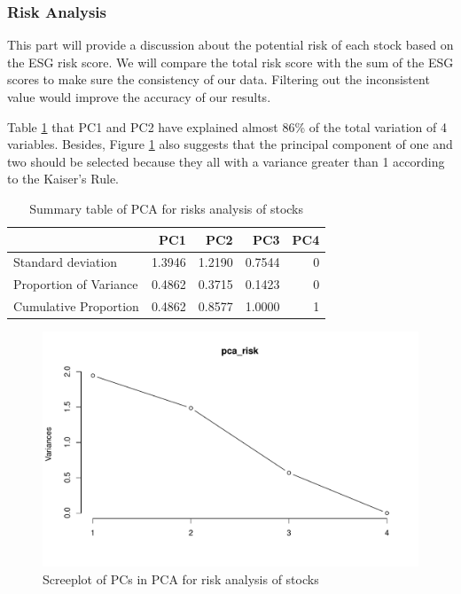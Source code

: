 \documentclass[11pt,a4paper,]{article}
\begin{document}
\hypertarget{risk-analysis}{%
\subsubsection{Risk Analysis}\label{risk-analysis}}

This part will provide a discussion about the potential risk of each stock based on the ESG risk score. We will compare the total risk score with the sum of the ESG scores to make sure the consistency of our data. Filtering out the inconsistent value would improve the accuracy of our results.

Table \ref{tab:pca-risk-summary} that PC1 and PC2 have explained almost 86\% of the total variation of 4 variables. Besides, Figure \ref{fig:pca-risk-screeplot} also suggests that the principal component of one and two should be selected because they all with a variance greater than 1 according to the Kaiser's Rule.

\begin{table}

\caption{\label{tab:pca-risk-summary}Summary table of PCA for risks analysis of stocks}
\centering
\begin{tabular}[t]{l|r|r|r|r}
\hline
  & PC1 & PC2 & PC3 & PC4\\
\hline
Standard deviation & 1.3946 & 1.2190 & 0.7544 & 0\\
\hline
Proportion of Variance & 0.4862 & 0.3715 & 0.1423 & 0\\
\hline
Cumulative Proportion & 0.4862 & 0.8577 & 1.0000 & 1\\
\hline
\end{tabular}
\end{table}

\begin{figure}
\centering
\includegraphics{ass2_files/figure-latex/pca-risk-screeplot-1.pdf}
\caption{\label{fig:pca-risk-screeplot}Screeplot of PCs in PCA for risk analysis of stocks}
\end{figure}
\end{document}

